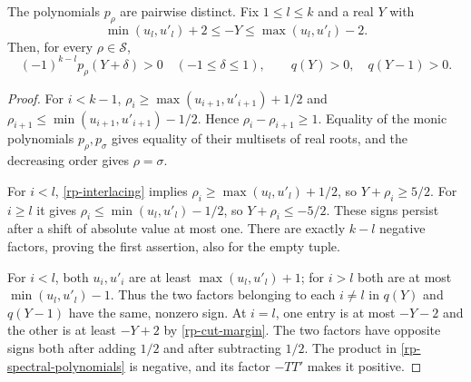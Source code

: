 \begin{lemma}\label{rp-parameter-signs}
The polynomials $p_\rho$ are pairwise distinct.
Fix $1\leq l\leq k$ and a real $Y$ with
\begin{equation}\label{rp-cut-margin}
          \min(u_l,u'_l)+2\leq-Y\leq\max(u_l,u'_l)-2.
\end{equation}
Then, for every $\rho\in\mathcal S$,
\[
 (-1)^{k-l}p_\rho(Y+\delta)>0\quad(-1\leq\delta\leq1),
               \qquad q(Y)>0,\quad q(Y-1)>0.
\]
\end{lemma}

\begin{proof}
For $i<k-1$,
$\rho_i\geq\max(u_{i+1},u'_{i+1})+1/2$ and
$\rho_{i+1}\leq\min(u_{i+1},u'_{i+1})-1/2$.
Hence $\rho_i-\rho_{i+1}\geq1$.
Equality of the monic polynomials $p_\rho,p_\sigma$
gives equality of their multisets of real roots, and
the decreasing order gives $\rho=\sigma$.

For $i<l$, \eqref{rp-interlacing} implies
$\rho_i\geq\max(u_l,u'_l)+1/2$, so
$Y+\rho_i\geq5/2$.
For $i\geq l$ it gives
$\rho_i\leq\min(u_l,u'_l)-1/2$, so
$Y+\rho_i\leq-5/2$.
These signs persist after a shift of absolute value at
most one.  There are exactly $k-l$ negative factors,
proving the first assertion, also for the empty tuple.

For $i<l$, both $u_i,u'_i$ are at least
$\max(u_l,u'_l)+1$; for $i>l$ both are at most
$\min(u_l,u'_l)-1$.  Thus the two factors belonging to
each $i\ne l$ in $q(Y)$ and $q(Y-1)$ have the same,
nonzero sign.  At $i=l$, one entry is at most $-Y-2$
and the other is at least $-Y+2$ by
\eqref{rp-cut-margin}.  The two factors have opposite
signs both after adding $1/2$ and after subtracting
$1/2$.  The product in \eqref{rp-spectral-polynomials}
is negative, and its factor $-TT'$ makes it positive.
\end{proof}

